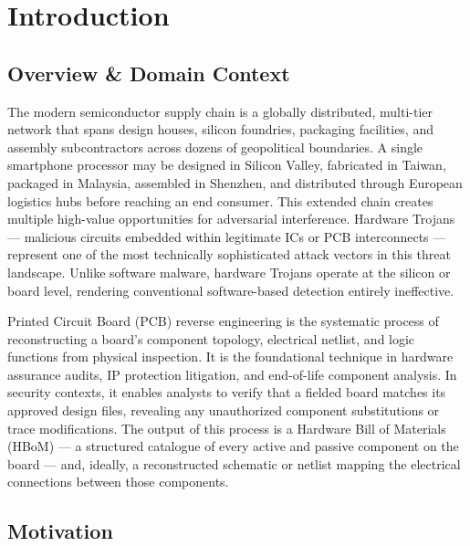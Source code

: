 \documentclass[12pt,a4paper]{report}
\begin{document}
\chapter{Introduction}
\label{chap:introduction}

\section{Overview \& Domain Context}
\label{sec:hw_assurance}

The modern semiconductor supply chain is a globally distributed, multi-tier network that spans design houses, silicon foundries, packaging facilities, and assembly subcontractors across dozens of geopolitical boundaries. A single smartphone processor may be designed in Silicon Valley, fabricated in Taiwan, packaged in Malaysia, assembled in Shenzhen, and distributed through European logistics hubs before reaching an end consumer. This extended chain creates multiple high-value opportunities for adversarial interference. Hardware Trojans --- malicious circuits embedded within legitimate ICs or PCB interconnects --- represent one of the most technically sophisticated attack vectors in this threat landscape. Unlike software malware, hardware Trojans operate at the silicon or board level, rendering conventional software-based detection entirely ineffective.

Printed Circuit Board (PCB) reverse engineering is the systematic process of reconstructing a board's component topology, electrical netlist, and logic functions from physical inspection. It is the foundational technique in hardware assurance audits, IP protection litigation, and end-of-life component analysis. In security contexts, it enables analysts to verify that a fielded board matches its approved design files, revealing any unauthorized component substitutions or trace modifications. The output of this process is a Hardware Bill of Materials (HBoM) --- a structured catalogue of every active and passive component on the board --- and, ideally, a reconstructed schematic or netlist mapping the electrical connections between those components.

\section{Motivation}
\label{sec:motivation}
\end{document}
